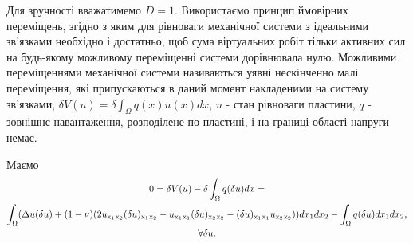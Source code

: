 \documentclass[12pt]{report}
\begin{document}
 Для зручності вважатимемо $D=1$. Використаємо принцип ймовірних переміщень, згідно з яким для рівноваги механічної системи з ідеальними зв'язками необхідно і достатньо, щоб сума віртуальних робіт тільки активних сил на будь-якому можливому переміщенні системи дорівнювала нулю. Можливими переміщеннями механічної системи називаються уявні нескінченно малі переміщення, які припускаються в даний момент накладеними на систему зв'язками, $\delta V( u)=\delta\int_{\Omega}q(x) u(x)dx$, $u$ - стан рівноваги пластини, $q$ - зовнішнє навантаження, розподілене по пластині, і на границі області напруги немає.
 
 Маємо 
 \begin{gather*}
 	0=\delta V( u)-\delta\int_{\Omega}q(\delta u)dx= \\
 	\int_{\Omega}(\Delta u(\delta u)+(1-\nu)(2 u\textsubscript{x\textsubscript{1}}\textsubscript{x\textsubscript{2}}(\delta u)\textsubscript{x\textsubscript{1}}\textsubscript{x\textsubscript{2}}- u\textsubscript{x\textsubscript{1}}\textsubscript{x\textsubscript{1}}(\delta u)\textsubscript{x\textsubscript{2}}\textsubscript{x\textsubscript{2}}-(\delta u)\textsubscript{x\textsubscript{1}}\textsubscript{x\textsubscript{1}} u\textsubscript{x\textsubscript{2}}\textsubscript{x\textsubscript{2}}))dx\textsubscript{1}dx\textsubscript{2} - \int_{\Omega}q(\delta u)dx\textsubscript{1}dx\textsubscript{2}, \\
  \forall \delta u.
\end{gather*}
\end{document}

